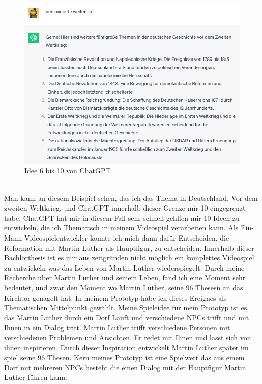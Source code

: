 \documentclass[12pt,a4paper,bibliography=totocnumbered,listof=totocnumbered]{scrartcl}
\begin{document}
\begin{figure}[h]
	\centering
	\includegraphics[scale=0.7]{BilderFuerBA/ChatGPT5Themen2.png}
	\caption{Idee 6 bis 10 von ChatGPT}
	\label{fig:Zweiten-Fünf-Idenn}
\end{figure}
\\
Man kann an diesem Beispiel sehen, das ich das Thema in Deutschland, Vor dem zweiten Weltkrieg. und ChatGPT innerhalb dieser Grenze mir 10 eingegrenzt habe.
ChatGPT hat mir in diesem Fall sehr schnell gehlfen mir 10 Ideen zu entwickeln, die ich Thematisch in meinem Videospiel verarbeiten kann. Als Ein-Mann-Videospielentwickler konnte ich mich dann dafür Entscheiden, die Reformation mit Martin Luther als Hauptfigur, zu entscheiden.
Innerhalb dieser Bachlorthesis ist es mir aus zeitgründen nicht möglich ein komplettes Videospiel zu entwickeln was das Leben von Martin Luther wiederspiegelt. Durch meine Recherche über Martin Luther und seinem Leben, fand ich eine Moment sehr bedeutet, und zwar den Moment wo Martin Luther, seine 96 Thesesn an das Kirchtor genagelt hat.
In meinem Prototyp habe ich dieses Ereignes als Thematischen Mittelpunkt gewählt.
Meine Spieleidee für mein Prototyp ist es, das Martin Luther durch ein Dorf Läuft und verschiedene NPCs trifft und mit Ihnen in ein Dialog tritt. Martin Luther trifft verschiedene Personen mit verschiedenen Problemen und Ansichten. Er redet mit Ihnen und lässt sich von ihnen inspirieren. Durch dieser Inspiration entwickelt Martin Luther später im spiel seine 96 Thesen.
Kern meines Prototyp ist eine Spielwert das aus einem Dorf mit mehreren NPCs besteht die einen Dialog mit der Hauptfigur Martin Luther führen kann.
\end{document}
